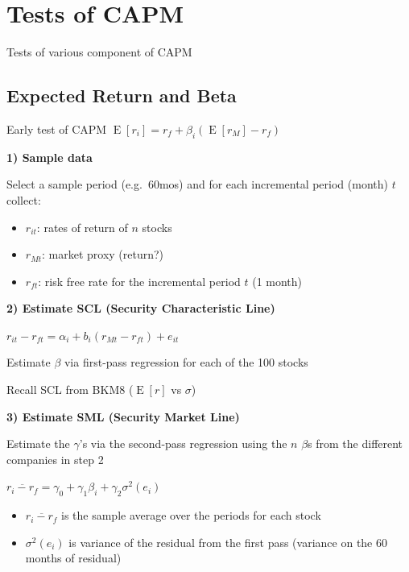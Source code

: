 \documentclass[]{book}
\providecommand{\tightlist}{%
  \setlength{\itemsep}{0pt}\setlength{\parskip}{0pt}}
\theoremstyle{definition}
\theoremstyle{definition}
\theoremstyle{remark}
\begin{document}
\section{Tests of CAPM}\label{tests-of-capm}

Tests of various component of CAPM

\subsection{Expected Return and Beta}\label{expected-return-and-beta}

Early test of CAPM
\(\operatorname{E}[r_i] = r_f + \beta_i \left( \operatorname{E}[r_M] - r_f \right)\)

\textbf{1) Sample data}

Select a sample period (e.g.~60mos) and for each incremental period
(month) \(t\) collect:

\begin{itemize}
\tightlist
\item
  \(r_{it}\): rates of return of \(n\) stocks
\item
  \(r_{Mt}\): market proxy (return?)
\item
  \(r_{ft}\): risk free rate for the incremental period \(t\) (1 month)
\end{itemize}

\textbf{2) Estimate SCL (Security Characteristic Line)}

\(r_{it} - r_{ft} = \alpha_i + b_i(r_{Mt} - r_{ft}) + e_{it}\)

Estimate \(\beta\) via first-pass regression for each of the 100 stocks

Recall SCL from BKM8 (\(\operatorname{E}[r]\) vs \(\sigma\))

\textbf{3) Estimate SML (Security Market Line)}

Estimate the \(\gamma\)'s via the second-pass regression using the \(n\)
\(\beta\)s from the different companies in step 2

\(\overline{r_i - r_f} = \gamma_0 + \gamma_1 \beta_i + \gamma_2 \sigma^2(e_i)\)

\begin{itemize}
\item
  \(\overline{r_i - r_f}\) is the sample average over the periods for
  each stock
\item
  \(\sigma^2(e_i)\) is variance of the residual from the first pass
  (variance on the 60 months of residual)
\end{itemize}
\end{document}
